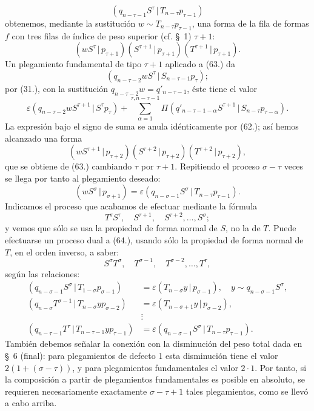 \documentclass[11pt]{article}
\newcommand{\pair}[2]{(#1\,|\,#2)}
\newcommand{\eps}{\varepsilon}
\begin{document}
\[
 \pair{q_{n-\tau-1}S^\tau}{T_{n-\tau}p_{\tau-1}}
\]
obtenemos, mediante la sustitución $w\sim T_{n-\tau}p_{\tau-1}$, una forma de la fila de formas $f$ con tres filas de índice de peso superior (cf. \S\ 1) $\tau+1$:
\begin{equation}
 \pair{wS^\tau}{p_{\tau+1}}\pair{S^{\tau+1}}{p_{\tau+1}}\pair{T^{\tau+1}}{p_{\tau+1}}.
\tag{63}
\end{equation}
Un plegamiento fundamental de tipo $\tau+1$ aplicado a (63.) da
\[
 \pair{q_{n-\tau-2}wS^\tau}{S_{n-\tau-1}p_\tau};
\]
por (31.), con la sustitución $q_{n-\tau-2}w=q'_{n-\tau-1}$, éste tiene el valor
\[
 \eps\pair{q_{n-\tau-2}wS^{\tau+1}}{S^\tau p_\tau}
 +\sum_{\alpha=1}^{\tau,n-\tau-1}\Pi\pair{q'_{n-\tau-1-\alpha}S^{\tau+1}}{S_{n-\tau}p_{\tau-\alpha}}.
\]
La expresión bajo el signo de suma se anula idénticamente por (62.); así hemos alcanzado una forma
\[
 \pair{wS^{\tau+1}}{p_{\tau+2}}\pair{S^{\tau+2}}{p_{\tau+2}}\pair{T^{\tau+2}}{p_{\tau+2}},
\]
que se obtiene de (63.) cambiando $\tau$ por $\tau+1$. Repitiendo el proceso $\sigma-\tau$ veces se llega por tanto al plegamiento deseado:
\[
 \pair{wS^\sigma}{p_{\sigma+1}}=\eps\pair{q_{n-\sigma-1}S^\sigma}{T_{n-\tau}p_{\tau-1}}.
\]
Indicamos el proceso que acabamos de efectuar mediante la fórmula
\begin{equation}
 T^\tau S^\tau,
\quad S^{\tau+1},\quad S^{\tau+2},\ldots,S^\sigma;
\tag{64}
\end{equation}
y vemos que sólo se usa la propiedad de forma normal de $S$, no la de $T$. Puede efectuarse un proceso dual a (64.), usando sólo la propiedad de forma normal de $T$, en el orden inverso, a saber:
\begin{equation}
 S^\sigma T^\sigma,
\quad T^{\sigma-1},\quad T^{\sigma-2},\ldots,T^\tau,
\tag{65}
\end{equation}
según las relaciones:
\begin{align*}
\pair{q_{n-\sigma-1}S^\sigma}{T_{1-\sigma}p_{\sigma-1}}&=\eps\pair{T_{n-\sigma}y}{p_{\sigma-1}},\quad y\sim q_{n-\sigma-1}S^\sigma,\\
\pair{q_{n-\sigma}T^{\sigma-1}}{T_{n-\sigma}yp_{\sigma-2}}&=\eps\pair{T_{n-\sigma+1}y}{p_{\sigma-2}},\\
&\vdots\\
\pair{q_{n-\tau-1}T^\tau}{T_{n-\tau-1}yp_{\tau-1}}&=\eps\pair{q_{n-\sigma-1}S^\sigma}{T_{n-\tau}p_{\tau-1}}.
\end{align*}
También debemos señalar la conexión con la disminución del peso total dada en \S\ 6 (final): para plegamientos de defecto 1 esta disminución tiene el valor $2(1+(\sigma-\tau))$, y para plegamientos fundamentales el valor $2\cdot1$. Por tanto, si la composición a partir de plegamientos fundamentales es posible en absoluto, se requieren necesariamente exactamente $\sigma-\tau+1$ tales plegamientos, como se llevó a cabo arriba.
\end{document}
